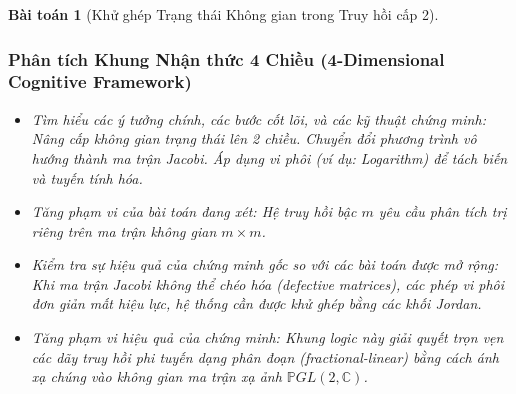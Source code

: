 \documentclass{article}
\newtheorem{baitoan}{Bài toán}
\begin{document}
\begin{baitoan}[Khử ghép Trạng thái Không gian trong Truy hồi cấp 2]
 \subsubsection*{Phân tích Khung Nhận thức 4 Chiều (4-Dimensional Cognitive Framework)}
 \begin{itemize}
 \item \textit{Tìm hiểu các ý tưởng chính, các bước cốt lõi, và các kỹ thuật chứng minh}: Nâng cấp không gian trạng thái lên 2 chiều. Chuyển đổi phương trình vô hướng thành ma trận Jacobi. Áp dụng vi phôi (ví dụ: Logarithm) để tách biến và tuyến tính hóa.
 \item \textit{Tăng phạm vi của bài toán đang xét}: Hệ truy hồi bậc $m$ yêu cầu phân tích trị riêng trên ma trận không gian $m \times m$.
 \item \textit{Kiểm tra sự hiệu quả của chứng minh gốc so với các bài toán được mở rộng}: Khi ma trận Jacobi không thể chéo hóa (defective matrices), các phép vi phôi đơn giản mất hiệu lực, hệ thống cần được khử ghép bằng các khối Jordan.
 \item \textit{Tăng phạm vi hiệu quả của chứng minh}: Khung logic này giải quyết trọn vẹn các dãy truy hồi phi tuyến dạng phân đoạn (fractional-linear) bằng cách ánh xạ chúng vào không gian ma trận xạ ảnh $\mathbb{P}GL(2, \mathbb{C})$.
 \end{itemize}
\end{baitoan}

\end{document}
